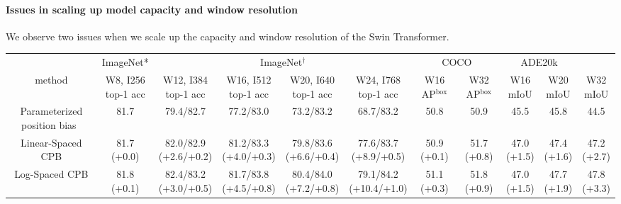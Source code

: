 \documentclass[10pt,twocolumn,letterpaper]{article}
\newcommand{\shl}[1]{\footnotesize{#1}}
\newcommand{\hl}[1]{\footnotesize{#1}}
\begin{document}
\paragraph{Issues in scaling up model capacity and window resolution} We observe two issues when we scale up the capacity and window resolution of the Swin Transformer.


\begin{table}[t]
\centering
\small
\addtolength{\tabcolsep}{-3.1pt}
\begin{tabular}{c|c|c|c|c|c|c|c|c|c|c}
\Xhline{1.0pt}
& ImageNet* & \multicolumn{4}{c|}{ImageNet$^\dag$} & \multicolumn{2}{c|}{COCO} & \multicolumn{2}{c}{ADE20k} \\
\cline{2-11}
method & \makecell{W8, I256 \\ top-1 acc} & \makecell{W12, I384 \\ top-1 acc} & \makecell{W16, I512\\top-1 acc} & \makecell{W20, I640 \\top-1 acc} & \makecell{W24, I768\\top-1 acc} & \makecell{W16\\AP$^\text{box}$} & \makecell{W32\\AP$^\text{box}$} & \makecell{W16\\mIoU}& \makecell{W20\\mIoU} &\makecell{W32\\mIoU} \\
\hline
Parameterized position bias~\cite{liu2021swin} & 81.7 & 79.4/82.7 & 77.2/83.0 & 73.2/83.2 & 68.7/83.2 & 50.8 & 50.9 &45.5 & 45.8 & 44.5\\
\hline
Linear-Spaced CPB & \makecell{81.7\\\shl{(+0.0)}} & \makecell{82.0/82.9\\\shl{(+2.6/+0.2)}} & \makecell{81.2/83.3\\\shl{(+4.0/+0.3)}} & \makecell{79.8/83.6\\\shl{(+6.6/+0.4)}} & \makecell{77.6/83.7\\\shl{(+8.9/+0.5)}} & \makecell{50.9\\\shl{(+0.1)}} &\makecell{51.7\\\shl{(+0.8)}}  & \makecell{47.0\\\shl{(+1.5)}}&\makecell{47.4\\\shl{(+1.6)}} & \makecell{47.2\\\shl{(+2.7)}}\\
\hline
Log-Spaced CPB & \makecell{81.8\\\hl{(+0.1)}} &\makecell{82.4/83.2\\\hl{(+3.0/+0.5)}} &\makecell{81.7/83.8\\\hl{(+4.5/+0.8)}} & \makecell{80.4/84.0\\\hl{(+7.2/+0.8)}} & \makecell{79.1/84.2\\\hl{(+10.4/+1.0)}} &\makecell{51.1\\\hl{(+0.3)}} & \makecell{51.8\\\hl{(+0.9)}} & \makecell{47.0\\\hl{(+1.5)}} &\makecell{47.7\\\hl{(+1.9)}} & \makecell{47.8\\\hl{(+3.3)}} \\

\end{tabular}
\end{table}
\end{document}
